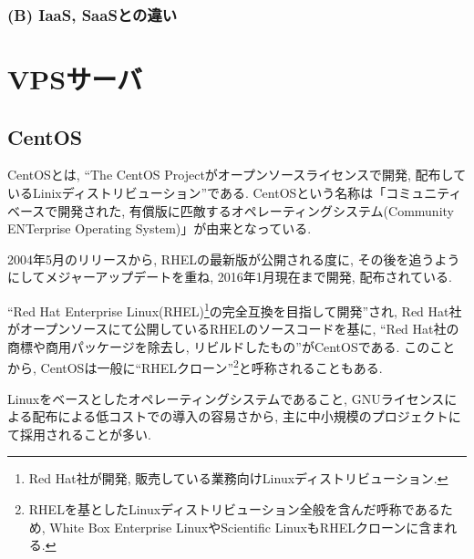\subsubsection{(B) IaaS, SaaSとの違い}

\section{VPSサーバ}
\subsection{CentOS}
CentOSとは, “The CentOS Projectがオープンソースライセンスで開発, 配布しているLinixディストリビューション”である.
CentOSという名称は「コミュニティベースで開発された, 有償版に匹敵するオペレーティングシステム(Community ENTerprise Operating System)」が由来となっている.

2004年5月のリリースから, RHELの最新版が公開される度に, その後を追うようにしてメジャーアップデートを重ね, 2016年1月現在まで開発, 配布されている.

“Red Hat Enterprise Linux(RHEL)\footnote{Red Hat社が開発, 販売している業務向けLinuxディストリビューション.}の完全互換を目指して開発”され, Red Hat社がオープンソースにて公開しているRHELのソースコードを基に, “Red Hat社の商標や商用パッケージを除去し, リビルドしたもの”がCentOSである.
このことから, CentOSは一般に“RHELクローン”\footnote{RHELを基としたLinuxディストリビューション全般を含んだ呼称であるため, White Box Enterprise LinuxやScientific LinuxもRHELクローンに含まれる.}と呼称されることもある.

Linuxをベースとしたオペレーティングシステムであること, GNUライセンスによる配布による低コストでの導入の容易さから, 主に中小規模のプロジェクトにて採用されることが多い.
